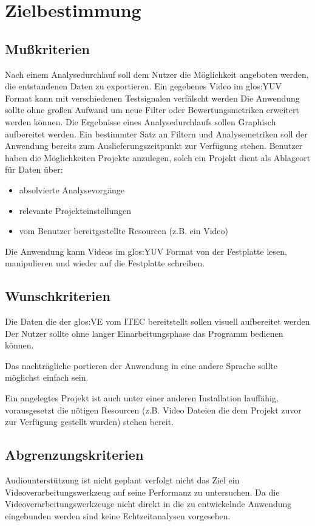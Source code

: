 \chapter{Zielbestimmung}

\section{Mußkriterien}
\setcounter{enumi}{0}
 Nach einem Analysedurchlauf soll dem Nutzer die Möglichkeit angeboten werden, die entstandenen Daten zu exportieren.
 Ein gegebenes Video im \gls{glos:YUV} Format kann mit verschiedenen Testsignalen verfälscht werden 
 Die Anwendung sollte ohne großen Aufwand um neue Filter oder Bewertungsmetriken erweitert werden können.
 Die Ergebnisse eines Analysedurchlaufs sollen Graphisch aufbereitet werden.
 Ein bestimmter Satz an Filtern und Analysemetriken soll der Anwendung bereits zum Auslieferungszeitpunkt zur Verfügung stehen.
 Benutzer haben die Möglichkeiten Projekte anzulegen, solch ein Projekt dient als Ablageort für Daten über:
\begin{itemize}
\item absolvierte Analysevorgänge
\item relevante Projekteinstellungen
\item vom Benutzer bereitgestellte Resourcen (z.B. ein Video)
\end{itemize}
 Die Anwendung kann Videos im \gls{glos:YUV} Format von der Festplatte lesen, manipulieren und wieder auf die Festplatte schreiben.

\section{Wunschkriterien}
\setcounter{enumi}{0}
 Die Daten die der \gls{glos:VE} vom \gls{ITEC}  bereitstellt sollen visuell aufbereitet werden
 Der Nutzer sollte ohne langer Einarbeitungsphase das Programm bedienen können.

 Das nachträgliche portieren der Anwendung in eine andere Sprache sollte möglichst einfach sein.

 Ein angelegtes Projekt ist auch unter einer anderen \projektTitel Installation lauffähig, vorausgesetzt die nötigen Resourcen (z.B. Video Dateien die dem Projekt zuvor zur Verfügung gestellt wurden) stehen bereit.

\section{Abgrenzungskriterien}
\setcounter{enumi}{0}
 Audiounterstützung ist nicht geplant
 \projektTitel verfolgt nicht das Ziel ein Videoverarbeitungswerkzeug auf seine Performanz zu untersuchen.
 Da die Videoverarbeitungswerkzeuge nicht direkt in die zu entwickelnde Anwendung eingebunden werden sind keine Echtzeitanalysen vorgesehen.

